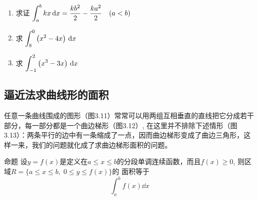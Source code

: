\begin{ex}
\begin{enumerate}
    \item 求证 $\displaystyle\int_{a}^{b} k x\,{\rm d} x=\dfrac{k b^{2}}{2}-\dfrac{k a^{2}}{2} \quad(a<b)$
    \item  求 $\displaystyle\int_{8}^{0}\left(x^{2}-4 x\right) \,{\rm d} x$
    \item  求 $\displaystyle\int_{-1}^{2}\left(x^{3}-3 x\right) \,{\rm d} x$
\end{enumerate}
\end{ex}

\subsection{逼近法求曲线形的面积}

任意一条曲线围成的图形（图3.11）常常可以用两组互相垂直的直线把它分成若干部分，每一部分都是一个曲边梯形（图3.12）, 在这里并不排除下述情形（图3.13）：两条平行的边中有一条缩成了一点，因而曲边梯形变成了曲边三角形，这样一来，我们的问题就化成了求曲边梯形面积的问题。

\begin{figure}[htp]
    \centering
    
    \caption{}
\end{figure}

\begin{figure}[htp]
    \centering
    
    \caption{}
\end{figure}

\begin{figure}[htp]
    \centering
    
    \caption{}
\end{figure}

\begin{blk}
  {命题} 设$y=f(x)$是定义在$a\le x\le b$的分段单调连续函数，而且$f(x)\ge 0$, 则区域$R=\{a\le x\le b,\; 0\le y\le f(x)\}$的
面积等于
\[\int^b_a f (x) \dd x \]  
\end{blk}

